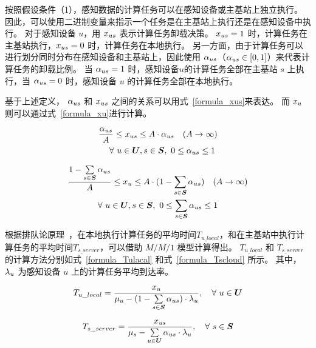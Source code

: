 按照假设条件（1），感知数据的计算任务可以在感知设备或主基站上独立执行。
因此，可以使用二进制变量来指示一个任务是在主基站上执行还是在感知设备中执行。
对于感知设备 $u$，用 ${x}_{us}$ 表示计算任务卸载决策。
${x}_{us} = 1$ 时，计算任务在主基站执行，${x}_{us} = 0$ 时，计算任务在本地执行。
另一方面，由于计算任务可以进行划分同时分布在感知设备和主基站上，因此使用 ${\alpha}_{us}$（${\alpha}_{us} \in [0,1]$）来代表计算任务的卸载比例。
当 ${\alpha}_{us} = 1$ 时，感知设备$u$的计算任务全部在主基站 $s$ 上执行，当 ${\alpha}_{us} = 0$ 时，感知设备 $u$ 的计算任务全部在本地执行。

基于上述定义， ${\alpha}_{us}$ 和 ${x}_{us}$ 之间的关系可以用式~\eqref{formula_xus}来表达。
而 ${x}_{u}$ 则可以通过式~\eqref{formula_xu}进行计算。

\begin{equation}
  \label{formula_xus}
  \begin{gathered}
  \frac{{\alpha}_{us}}{A} \leq {x}_{us} \leq A \cdot {\alpha}_{us} \quad (A \to \infty) \\
  \quad \forall \ u \in \boldsymbol{U}, s \in \boldsymbol{S}, \ 0\leq {\alpha}_{us} \leq 1
  \end{gathered}
\end{equation}

\begin{equation}
\label{formula_xu}
\begin{gathered}
\frac{1 - \sum\limits_{s \in \boldsymbol{S}}{{\alpha}_{us}}}{A} \leq {x}_{u} \leq A \cdot (1 - \sum_{s \in \boldsymbol{S}}{{\alpha}_{us}}) \quad (A \to \infty) \\
\forall\ u \in \boldsymbol{U}, s \in \boldsymbol{S}, \ 0\leq \sum_{s \in \boldsymbol{S}}{{\alpha}_{us}} \leq 1
\end{gathered}
\end{equation}

根据排队论原理~\cite{Queueing:systems}，在本地执行计算任务的平均时间$T_{u\_local}$，和在主基站中执行计算任务的平均时间$T_{s\_server}$，可以借助 $M/M/1$ 模型计算得出。
$T_{u\_local}$ 和 $T_{s\_server}$ 的计算方法分别如式~\eqref{formula_Tulacal} 和式~\eqref{formula_Tscloud} 所示。
其中，${\lambda}_{u}$ 为感知设备 $u$ 上的计算任务平均到达率。

\begin{equation}
\label{formula_Tulacal}
{T}_{u\_local} = \frac{{x}_{u}}{{\mu}_{u} - (1 - \sum\limits_{s \in \boldsymbol{S}} {\alpha}_{us}) \cdot {\lambda}_{u}}, \quad \forall \ u \in \boldsymbol{U}
\end{equation}


\begin{equation}
\label{formula_Tscloud}
{T}_{s\_server} = \frac{{x}_{us}}{{\mu}_{s} - \sum\limits_{u \in \boldsymbol{U}} {\alpha}_{us} \cdot {\lambda}_{u}}, \quad \forall \ s \in \boldsymbol{S}
\end{equation}

